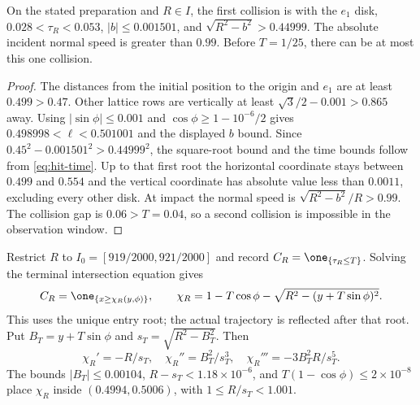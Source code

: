 \begin{lemma}\label{lem:tube}
On the stated preparation and $R\in I$, the first collision is with the $e_1$ disk, $0.028<\tau_R<0.053$, $|b|\le0.001501$, and $\sqrt{R^2-b^2}>0.44999$. The absolute incident normal speed is greater than $0.99$. Before $T=1/25$, there can be at most this one collision.
\end{lemma}
\begin{proof}
The distances from the initial position to the origin and $e_1$ are at least $0.499>0.47$. Other lattice rows are vertically at least $\sqrt3/2-0.001>0.865$ away. Using $|\sin\phi|\le0.001$ and $\cos\phi\ge1-10^{-6}/2$ gives
$0.498998<\ell<0.501001$ and the displayed $b$ bound. Since
$0.45^2-0.001501^2>0.44999^2$, the square-root bound and the time bounds follow from \eqref{eq:hit-time}. Up to that first root the horizontal coordinate stays between $0.499$ and $0.554$ and the vertical coordinate has absolute value less than $0.0011$, excluding every other disk. At impact the normal speed is $\sqrt{R^2-b^2}/R>0.99$. The collision gap is $0.06>T=0.04$, so a second collision is impossible in the observation window.
\end{proof}

Restrict $R$ to $I_0=[919/2000,921/2000]$ and record
$C_R=\one_{\{\tau_R\le T\}}$. Solving the terminal intersection equation gives
\begin{equation}
 C_R=\one_{\{x\ge\chi_R(y,\phi)\}},\qquad
 \chi_R=1-T\cos\phi-\sqrt{R^2-(y+T\sin\phi)^2}.
 \label{eq:chi}
\end{equation}
This uses the unique entry root; the actual trajectory is reflected after that root. Put $B_T=y+T\sin\phi$ and $s_T=\sqrt{R^2-B_T^2}$. Then
\[
 \chi_R'=-R/s_T,\quad\chi_R''=B_T^2/s_T^3,\quad
 \chi_R'''=-3B_T^2R/s_T^5.
\]
The bounds $|B_T|\le0.00104$, $R-s_T<1.18\times10^{-6}$, and
$T(1-\cos\phi)\le2\times10^{-8}$ place $\chi_R$ inside $(0.4994,0.5006)$, with $1\le R/s_T<1.001$.

